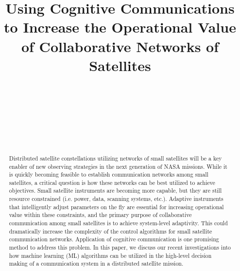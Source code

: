 \documentclass[conference]{IEEEtran}
\title{Using Cognitive Communications to Increase the Operational Value of
  Collaborative Networks of Satellites}
\author{
  \IEEEauthorblockN{Ryan B. Linnabary}
  \IEEEauthorblockA{\thisplace linnabary.24@osu.edu}
  \and
  \IEEEauthorblockN{Andrew J. O'Brien}
  \IEEEauthorblockA{\thisplace obrien.200@osu.edu}
  \and
  \IEEEauthorblockN{Graeme E. Smith}
  \IEEEauthorblockA{\thisplace smith.8347@osu.edu}
  \and
  \IEEEauthorblockN{Christopher Ball}
  \IEEEauthorblockA{\thisplace ball.51@osu.edu}
  \and {~} \and {~~~~~~~~~~~~~~~~~~~~~~~~~~~} \and
  \IEEEauthorblockN{Joel T. Johnson}
  \IEEEauthorblockA{\thisplace johnson.1374@osu.edu}
  \and {~~~~~~~~~~~~~~~~~~~~~~~} \and {~~~~~~~~~~~~~~~~~~~~~~}
}
\begin{document}
\maketitle



\begin{abstract}

  Distributed satellite constellations utilizing networks of small satellites
will be a key enabler of new observing strategies in the next generation of NASA
missions.  While it is quickly becoming feasible to establish communication
networks among small satellites, a critical question is how these networks can
be best utilized to achieve objectives.  Small satellite instruments are
becoming more capable, but they are still resource constrained (i.e. power,
data, scanning systems, etc.).  Adaptive instruments that intelligently adjust
parameters {\color{black} on the fly} are essential for increasing operational
value within these constraints, and the primary purpose of collaborative
communication among small satellites is to achieve system-level adaptivity.
This could dramatically increase the complexity of the control algorithms for
small satellite communication networks.
%
Application of cognitive communication is one promising method to address this problem.  In this paper, we discuss our recent investigations into how machine learning (ML) algorithms can be utilized in the high-level decision making of a communication system in a distributed satellite mission.

\end{abstract}
\end{document}
